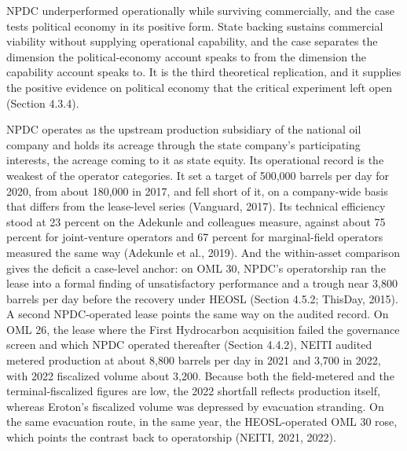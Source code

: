 \documentclass[twoside,fontset=lmodern]{mitthesis}
\begin{document}
NPDC underperformed operationally while surviving commercially, and the
case tests political economy in its positive form. State backing
sustains commercial viability without supplying operational capability,
and the case separates the dimension the political-economy account
speaks to from the dimension the capability account speaks to. It is the
third theoretical replication, and it supplies the positive evidence on
political economy that the critical experiment left open (Section
4.3.4).

NPDC operates as the upstream production subsidiary of the national oil
company and holds its acreage through the state company's participating
interests, the acreage coming to it as state equity. Its operational
record is the weakest of the operator categories. It set a target of
500,000 barrels per day for 2020, from about 180,000 in 2017, and fell
short of it, on a company-wide basis that differs from the lease-level
series (Vanguard, 2017). Its technical efficiency stood at 23 percent on
the Adekunle and colleagues measure, against about 75 percent for
joint-venture operators and 67 percent for marginal-field operators
measured the same way (Adekunle et al., 2019). And the within-asset
comparison gives the deficit a case-level anchor: on OML 30, NPDC's
operatorship ran the lease into a formal finding of unsatisfactory
performance and a trough near 3,800 barrels per day before the recovery
under HEOSL (Section 4.5.2; ThisDay, 2015). A second NPDC-operated lease
points the same way on the audited record. On OML 26, the lease where
the First Hydrocarbon acquisition failed the governance screen and which
NPDC operated thereafter (Section 4.4.2), NEITI audited metered
production at about 8,800 barrels per day in 2021 and 3,700 in 2022,
with 2022 fiscalized volume about 3,200. Because both the field-metered
and the terminal-fiscalized figures are low, the 2022 shortfall reflects
production itself, whereas Eroton's fiscalized volume was depressed by
evacuation stranding. On the same evacuation route, in the same year,
the HEOSL-operated OML 30 rose, which points the contrast back to
operatorship (NEITI, 2021, 2022).
\end{document}

